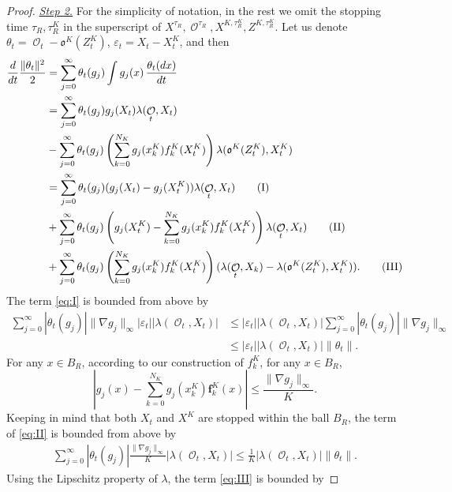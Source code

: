 \documentclass[11pt]{article}
\numberwithin{equation}{section}
\theoremstyle{plain}
\theoremstyle{definition}
\DeclareMathOperator{\calO}{\mathcal{O}}
\def\mo{\mathfrak{o}}
\begin{document}
\begin{proof}
\bigskip
\noindent\underline{\textit{Step 2.}} For the simplicity of notation, in the rest we omit the stopping time $\tau_R,\tau_R^K$ in the superscript of $X^{\tau_R},\calO^{\tau_R},X^{K,\tau^K_R},  Z^{K,\tau^K_R} $.
 Let us denote $\theta_t=\calO_t- \mo^K(Z_t^{K})$, $\varepsilon_t=X_t-X^K_t$, and then 
\begin{align}
    \frac{d}{dt} \frac{\lVert \theta_t \rVert^2}{2}  &= \sum_{j=0}^{\infty}  \theta_t(g_j) \int g_j(x) \,\frac{\theta_t(dx)}{dt} \notag \\
    &= \sum_{j=0}^{\infty}  \theta_t(g_j)g_j(X_t)\lambda(\calO_t,X_t) \notag \\
    &- \sum_{j=0}^{\infty} \theta_t(g_j) \left( \sum_{k=0}^{N_K} g_j(x_k^K){f}_k^K(X_t^K) \right)\lambda(\mo^K(Z_t^K), X_t^K) \notag \\
    &= \sum_{j=0}^{\infty}  \theta_t(g_j)(g_j(X_t)-g_j(X_t^K))\lambda(\calO_t,X_t) \tag{I} \label{eq:I}\\
     &+ \sum_{j=0}^{\infty} \theta_t(g_j) \left(g_j(X_t^K)- \sum_{k=0}^{N_K} g_j(x_k^K){f}_k^K(X_t^K) \right)\lambda(\calO_t,X_t) \tag{II} \label{eq:II} \\
     &+  \sum_{j=0}^{\infty} \theta_t(g_j) \left( \sum_{k=0}^{N_K} g_j(x_k^K){f}_k^K(X_t^K) \right) (\lambda(\calO_t,X_k)- \lambda(\mo^K(Z_t^K), X_t^K)). \tag{III} \label{eq:III}
\end{align}
The term \eqref{eq:I} is bounded from above by 
\begin{align*}
  \sum_{j=0}^{\infty}  \left| \theta_t(g_j) \right| \lVert \nabla g_j \rVert_{\infty}|\varepsilon_t| |\lambda(\calO_t,X_t)| &\leq  |\varepsilon_t| |\lambda(\calO_t,X_t)| \sum_{j=0}^{\infty}  \left| \theta_t(g_j) \right| \lVert \nabla g_j \rVert_{\infty} \\
 &\leq |\varepsilon_t| |\lambda(\calO_t,X_t)| \lVert \theta_t \rVert .
\end{align*}
For any $ x \in B_R$, according to our construction of $f_k^K$, for any $x \in B_R$, $$\left| g_j(x)- \sum_{k=0}^{N_K} g_j(x_k^K)\bm{f}_k^K(x) \right|\leq \frac{\lVert \nabla g_j \rVert_{\infty}}{K}.$$ 
Keeping in mind that both $X_t$ and $X^{K}$ are stopped within the ball $B_R$,  the term of \eqref{eq:II} is bounded from above by 
\begin{align*}
     \sum_{j=0}^{\infty} |\theta_t(g_j)| \frac{\lVert \nabla g_j \rVert_{\infty}}{K}|\lambda(\calO_t, X_t)| \leq \frac{1}{K}|\lambda(\calO_t,X_t)| \lVert \theta_t\rVert .
\end{align*}
Using the Lipschitz property of $\lambda$, the term \eqref{eq:III} is bounded by

\end{proof}
\end{document}
